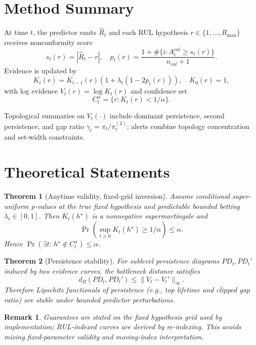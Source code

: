 \documentclass[11pt]{article}
\newtheorem{theorem}{Theorem}
\newtheorem{remark}{Remark}
\begin{document}
\section{Method Summary}
At time $t$, the predictor emits $\hat R_t$ and each RUL hypothesis $r \in \{1,\dots,R_{\max}\}$ receives nonconformity score
\begin{equation}
s_t(r)=|\hat R_t-r|,\quad
p_t(r)=\frac{1+\#\{i:A_i^{cal}\ge s_t(r)\}}{n_{cal}+1}.
\end{equation}
Evidence is updated by
\begin{equation}
K_t(r)=K_{t-1}(r)\left(1+\lambda_t(1-2p_t(r))\right),\quad K_0(r)=1,
\end{equation}
with log evidence $V_t(r)=\log K_t(r)$ and confidence set
\begin{equation}
C_t^\alpha=\{r:K_t(r)<1/\alpha\}.
\end{equation}

Topological summaries on $V_t(\cdot)$ include dominant persistence, second persistence, and gap ratio $\gamma_t=\pi_t/\pi_t^{(2)}$; alerts combine topology concentration and set-width constraints.

\section{Theoretical Statements}
\begin{theorem}[Anytime validity, fixed-grid inversion]
Assume conditional super-uniform p-values at the true fixed hypothesis and predictable bounded betting $\lambda_t \in [0,1]$. Then $K_t(h^\star)$ is a nonnegative supermartingale and
\[
\Pr\!\left(\sup_{t\ge 0}K_t(h^\star)\ge 1/\alpha\right)\le \alpha.
\]
Hence $\Pr(\exists t:\,h^\star\notin C_t^\alpha)\le \alpha$.
\end{theorem}

\begin{theorem}[Persistence stability]
For sublevel persistence diagrams $PD_t,PD_t'$ induced by two evidence curves, the bottleneck distance satisfies
\[
d_B(PD_t,PD_t')\le \|V_t-V_t'\|_\infty.
\]
Therefore Lipschitz functionals of persistence (e.g., top lifetime and clipped gap ratio) are stable under bounded predictor perturbations.
\end{theorem}

\begin{remark}
Guarantees are stated on the fixed hypothesis grid used by implementation; RUL-indexed curves are derived by re-indexing. This avoids mixing fixed-parameter validity and moving-index interpretation.
\end{remark}
\end{document}
